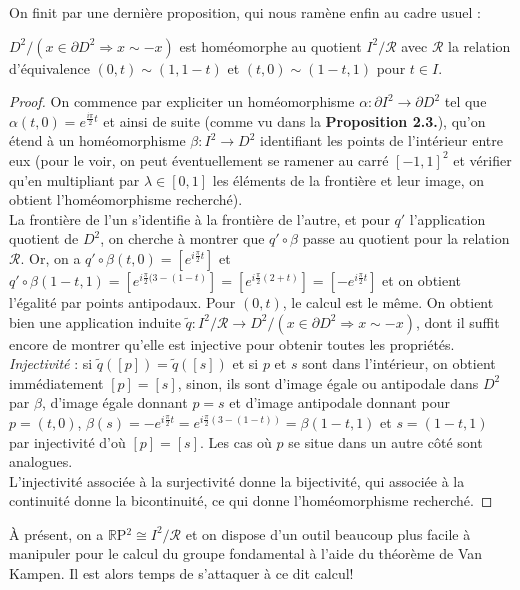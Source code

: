 \bigskip
On finit par une dernière proposition, qui nous ramène enfin au cadre usuel :
\begin{proposition}
    $D^2/(x\in\partial D^2\Rightarrow x\sim-x)$ est homéomorphe au quotient $I^2/\mathcal{R}$ avec $\mathcal{R}$ la relation d'équivalence $(0,t)\sim(1,1-t)$ et $(t,0)\sim(1-t,1)$ pour $t\in I$.
\end{proposition}
\begin{proof}
    On commence par expliciter un homéomorphisme $\alpha:\partial I^2\rightarrow\partial D^2$ tel que $\alpha(t,0)=e^{\frac{i\pi}{2}t}$ et ainsi de suite (comme vu dans la \textbf{Proposition 2.3.}), qu'on étend à un homéomorphisme $\beta:I^2\rightarrow D^2$ identifiant les points de l'intérieur entre eux (pour le voir, on peut éventuellement se ramener au carré $[-1,1]^2$ et vérifier qu'en multipliant par $\lambda\in[0,1]$ les éléments de la frontière et leur image, on obtient l'homéomorphisme recherché).\medskip\\
    La frontière de l'un s'identifie à la frontière de l'autre, et pour $q'$ l'application quotient de $D^2$, on cherche à montrer que $q'\circ\beta$ passe au quotient pour la relation $\mathcal{R}$. Or, on a $q'\circ\beta(t,0)=[e^{i\frac{\pi}{2}t}]$ et $q'\circ\beta(1-t,1)=[e^{i\frac{\pi}{2}(3-(1-t)}]=[e^{i\frac{\pi}{2}(2+t)}]=[-e^{i\frac{\pi}{2}t}]$ et on obtient l'égalité par points antipodaux. Pour $(0,t)$, le calcul est le même. On obtient bien une application induite $\tilde{q}:I^2/\mathcal{R}\to D^2/(x\in\partial D^2\Rightarrow x\sim -x)$, dont il suffit encore de montrer qu'elle est injective pour obtenir toutes les propriétés.\medskip\\
    \textit{Injectivité} : si $\tilde{q}([p])=\tilde{q}([s])$ et si $p$ et $s$ sont dans l'intérieur, on obtient immédiatement $[p]=[s]$, sinon, ils sont d'image égale ou antipodale dans $D^2$ par $\beta$, d'image égale donnant $p=s$ et d'image antipodale donnant pour $p=(t,0)$, $\beta(s)=-e^{i\frac{\pi}{2}t}=e^{i\frac{\pi}{2}(3-(1-t))}=\beta(1-t,1)$ et $s=(1-t,1)$ par injectivité d'où $[p]=[s]$. Les cas où $p$ se situe dans un autre côté sont analogues.\medskip\\
    L'injectivité associée à la surjectivité donne la bijectivité, qui associée à la continuité donne la bicontinuité, ce qui donne l'homéomorphisme recherché.
\end{proof}
À présent, on a $\mathbb{R}$P$^2\cong I^2/\mathcal{R}$ et on dispose d'un outil beaucoup plus facile à manipuler pour le calcul du groupe fondamental à l'aide du théorème de Van Kampen. Il est alors temps de s'attaquer à ce dit calcul!
